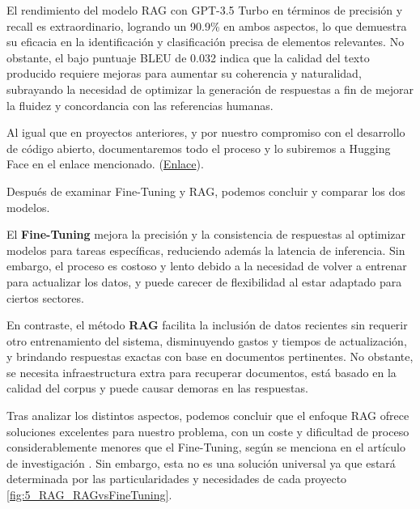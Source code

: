 \bigskip %

El rendimiento del modelo \acrshort{RAG} con \acrshort{GPT}-3.5 Turbo en términos de precisión y recall es extraordinario, logrando un 90.9\% en ambos aspectos, lo que demuestra su eficacia en la identificación y clasificación precisa de elementos relevantes. No obstante, el bajo puntuaje \acrshort{BLEU} de 0.032 indica que la calidad del texto producido requiere mejoras para aumentar su coherencia y naturalidad, subrayando la necesidad de optimizar la generación de respuestas a fin de mejorar la fluidez y concordancia con las referencias humanas.

\bigskip %

Al igual que en proyectos anteriores, y por nuestro compromiso con el desarrollo de código abierto, documentaremos todo el proceso y lo subiremos a Hugging Face en el enlace mencionado. (\href{https://huggingface.co/eibeel/gpt_RAG_TFG}{Enlace}).

\bigskip %

Después de examinar Fine-Tuning y \acrshort{RAG}, podemos concluir y comparar los dos modelos.

\bigskip %

El \textbf{Fine-Tuning} mejora la precisión y la consistencia de respuestas al optimizar modelos para tareas específicas, reduciendo además la latencia de inferencia. Sin embargo, el proceso es costoso y lento debido a la necesidad de volver a entrenar para actualizar los datos, y puede carecer de flexibilidad al estar adaptado para ciertos sectores.

\bigskip %


En contraste, el método \textbf{\acrshort{RAG}} facilita la inclusión de datos recientes sin requerir otro entrenamiento del sistema, disminuyendo gastos y tiempos de actualización, y brindando respuestas exactas con base en documentos pertinentes. No obstante, se necesita infraestructura extra para recuperar documentos, está basado en la calidad del corpus y puede causar demoras en las respuestas.

\bigskip %

Tras analizar los distintos aspectos, podemos concluir que el enfoque \acrshort{RAG} ofrece soluciones excelentes para nuestro problema, con un coste y dificultad de proceso considerablemente menores que el Fine-Tuning, según se menciona en el artículo de investigación \cite{ovadia2024finetuning}. Sin embargo, esta no es una solución universal ya que estará determinada por las particularidades y necesidades de cada proyecto \ref{fig:5_RAG_RAGvsFineTuning}.

